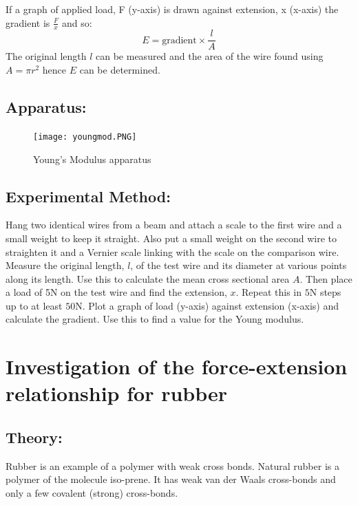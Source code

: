 If a graph of applied load, F (y-axis) is drawn against extension, x (x-axis) the gradient is $\frac{F}{x}$ and so: \[E = \text{gradient} \times \frac{l}{A}\]     
The original length $l$ can be measured and the area of the wire found using $A= \pi r^{2}$ hence $E$ can be determined.  
\subsection{Apparatus:}   
  \begin{figure}
\texttt{[image: youngmod.PNG]}
\caption{Young's Modulus apparatus}
\end{figure}
  
\subsection{Experimental Method:}  
Hang two identical wires from a beam and attach a scale to the first wire and a small weight to keep it straight. Also put a small weight on the second wire to straighten it and a Vernier scale linking with the scale on the comparison wire. Measure the original length, $l$, of the test wire and its diameter at various points along its length. Use this to calculate the mean cross sectional area $A$.  
Then place a load of {5}{N} on the test wire and find the extension, $x$. Repeat this in $5$N steps up to at least $50$N. Plot a graph of load (y-axis) against extension (x-axis) and calculate the gradient. Use this to find a value for the Young modulus. 

\section{Investigation of the force-extension relationship for rubber}
\subsection{Theory:}  
Rubber is an example of a polymer with weak cross bonds. Natural rubber is a polymer of the molecule iso-prene. It has weak van der Waals cross-bonds and only a few covalent (strong) cross-bonds.   
